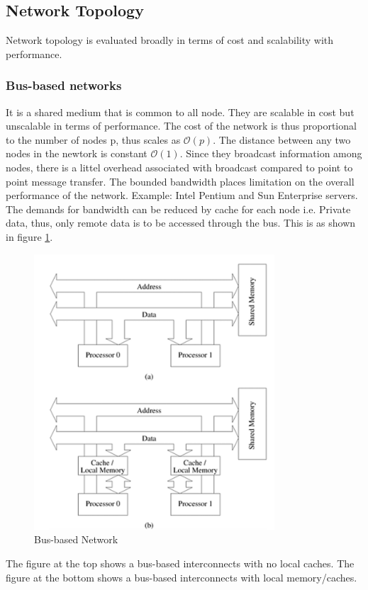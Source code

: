 \documentclass[12pt]{article}
\begin{document}
\subsection{Network Topology}
Network topology is evaluated broadly in terms of cost and scalability with performance.
\subsubsection{Bus-based networks}
It is a shared medium that is common to all node. They are scalable in cost but unscalable in terms of performance.
The cost of the network is thus proportional to the number of nodes p, thus scales as $\mathcal{O}(p)$. The distance between any two nodes in the newtork is constant $\mathcal{O}(1)$.
Since they broadcast information among nodes, there is a littel overhead associated with broadcast compared to point to point message transfer.
The bounded bandwidth places limitation on the overall performance of the network. Example: Intel Pentium and Sun Enterprise servers. The demands for bandwidth can be reduced by cache for
each node i.e. Private data, thus, only remote data is to be accessed through the bus.
This is as shown in figure \ref{fig:bus}.
\begin{figure}[H]
    \centering
    \includegraphics[width=0.8\textwidth]{images/bus.png}
    \caption{Bus-based Network}
    \label{fig:bus}
\end{figure}
The figure at the top shows a bus-based interconnects with no local caches.
The figure at the bottom shows a bus-based interconnects with local memory/caches.
\end{document}
